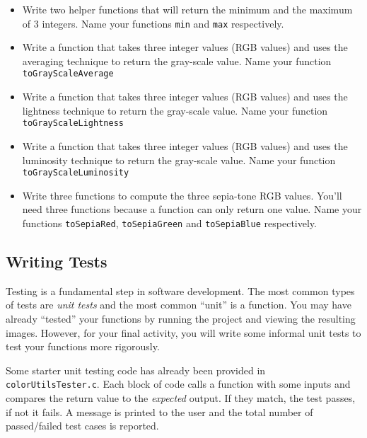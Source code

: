 \documentclass[12pt]{scrartcl}
\begin{document}
\begin{itemize}
  \item Write two helper functions that will return the minimum and the
  maximum of 3 integers.  Name your functions \texttt{min} and
  \texttt{max} respectively.
  
  \item Write a function that takes three integer values (RGB values) and
  uses the averaging technique to return the gray-scale value.  
  Name your function \texttt{toGrayScaleAverage}

  \item Write a function that takes three integer values (RGB values) and
  uses the lightness technique to return the gray-scale value.  
  Name your function \texttt{toGrayScaleLightness}

  \item Write a function that takes three integer values (RGB values) and
  uses the luminosity technique to return the gray-scale value.  
  Name your function \texttt{toGrayScaleLuminosity}

  \item Write three functions to compute the three sepia-tone RGB values.
  You'll need three functions because a function can only return one value.
  Name your functions \texttt{toSepiaRed}, \texttt{toSepiaGreen} and
  \texttt{toSepiaBlue} respectively.
\end{itemize}


\subsection{Writing Tests}

Testing is a fundamental step in software development.  The most common types
of tests are \emph{unit tests} and the most common ``unit'' is a function.
You may have already ``tested'' your functions by running the project and 
viewing the resulting images.  However, for your final activity, you will
write some informal unit tests to test your functions more rigorously.  

Some starter unit testing code has already been provided in 
\texttt{colorUtilsTester.c}.  Each block of code calls a function
with some inputs and compares the return value to the \emph{expected}
output.  If they match, the test passes, if not it fails.  A message is
printed to the user and the total number of passed/failed test cases is
reported.  
\end{document}
